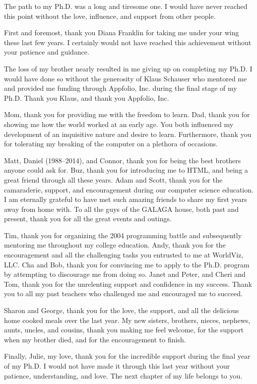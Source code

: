\begin{acknowledgements}

The path to my Ph.D. was a long and tiresome one. I would have never reached
this point without the love, influence, and support from other people.

First and foremost, thank you Diana Franklin for taking me under your wing
these last few years. I certainly would not have reached this achievement
without your patience and guidance.

The loss of my brother nearly resulted in me giving up on completing my Ph.D. I
would have done so without the generosity of Klaus Schauser who mentored me and
provided me funding through Appfolio, Inc. during the final stage of my
Ph.D. Thank you Klaus, and thank you Appfolio, Inc.

Mom, thank you for providing me with the freedom to learn. Dad, thank you for
showing me how the world worked at an early age. You both influenced my
development of an inquisitive nature and desire to learn. Furthermore, thank
you for tolerating my breaking of the computer on a plethora of occasions.

Matt, Daniel (1988--2014), and Connor, thank you for being the best brothers
anyone could ask for. Buz, thank you for introducing me to HTML, and being a
great friend through all these years. Adam and Scott, thank you for the
camaraderie, support, and encouragement during our computer science
education. I am eternally grateful to have met such amazing friends to share my
first years away from home with. To all the guys of the GALAGA house, both past
and present, thank you for all the great events and outings.

Tim, thank you for organizing the 2004 programming battle and subsequently
mentoring me throughout my college education. Andy, thank you for the
encouragement and all the challenging tasks you entrusted to me at WorldViz,
LLC. Cha and Bob, thank you for convincing me to apply to the Ph.D. program by
attempting to discourage me from doing so. Janet and Peter, and Cheri and Tom,
thank you for the unrelenting support and confidence in my success. Thank you
to all my past teachers who challenged me and encouraged me to succeed.

Sharon and George, thank you for the love, the support, and all the delicious
home cooked meals over the last year. My new sisters, brothers, nieces,
nephews, aunts, uncles, and cousins, thank you making me feel welcome, for the
support when my brother died, and for the encouragement to finish.

Finally, Julie, my love, thank you for the incredible support during the final
year of my Ph.D. I would not have made it through this last year without your
patience, understanding, and love. The next chapter of my life belongs to you.

\end{acknowledgements}

